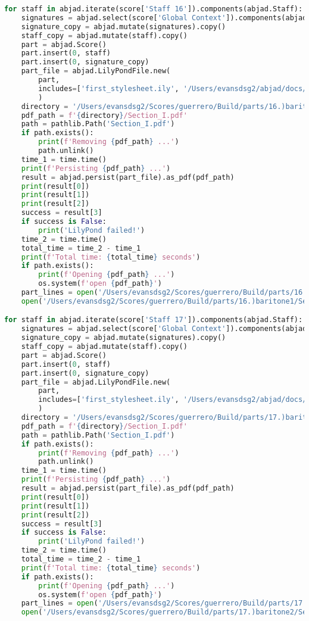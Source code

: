 \begin{lstlisting}[language=Python, caption=Invocation Source Code]
for staff in abjad.iterate(score['Staff 16']).components(abjad.Staff):
    signatures = abjad.select(score['Global Context']).components(abjad.Staff)
    signature_copy = abjad.mutate(signatures).copy()
    staff_copy = abjad.mutate(staff).copy()
    part = abjad.Score()
    part.insert(0, staff)
    part.insert(0, signature_copy)
    part_file = abjad.LilyPondFile.new(
        part,
        includes=['first_stylesheet.ily', '/Users/evansdsg2/abjad/docs/source/_stylesheets/abjad.ily'],
        )
    directory = '/Users/evansdsg2/Scores/guerrero/Build/parts/16.)baritone1'
    pdf_path = f'{directory}/Section_I.pdf'
    path = pathlib.Path('Section_I.pdf')
    if path.exists():
        print(f'Removing {pdf_path} ...')
        path.unlink()
    time_1 = time.time()
    print(f'Persisting {pdf_path} ...')
    result = abjad.persist(part_file).as_pdf(pdf_path)
    print(result[0])
    print(result[1])
    print(result[2])
    success = result[3]
    if success is False:
        print('LilyPond failed!')
    time_2 = time.time()
    total_time = time_2 - time_1
    print(f'Total time: {total_time} seconds')
    if path.exists():
        print(f'Opening {pdf_path} ...')
        os.system(f'open {pdf_path}')
    part_lines = open('/Users/evansdsg2/Scores/guerrero/Build/parts/16.)baritone1/Section_I.ly').readlines()
    open('/Users/evansdsg2/Scores/guerrero/Build/parts/16.)baritone1/Section_I.ly', 'w').writelines(part_lines[15:-1])

for staff in abjad.iterate(score['Staff 17']).components(abjad.Staff):
    signatures = abjad.select(score['Global Context']).components(abjad.Staff)
    signature_copy = abjad.mutate(signatures).copy()
    staff_copy = abjad.mutate(staff).copy()
    part = abjad.Score()
    part.insert(0, staff)
    part.insert(0, signature_copy)
    part_file = abjad.LilyPondFile.new(
        part,
        includes=['first_stylesheet.ily', '/Users/evansdsg2/abjad/docs/source/_stylesheets/abjad.ily'],
        )
    directory = '/Users/evansdsg2/Scores/guerrero/Build/parts/17.)baritone2'
    pdf_path = f'{directory}/Section_I.pdf'
    path = pathlib.Path('Section_I.pdf')
    if path.exists():
        print(f'Removing {pdf_path} ...')
        path.unlink()
    time_1 = time.time()
    print(f'Persisting {pdf_path} ...')
    result = abjad.persist(part_file).as_pdf(pdf_path)
    print(result[0])
    print(result[1])
    print(result[2])
    success = result[3]
    if success is False:
        print('LilyPond failed!')
    time_2 = time.time()
    total_time = time_2 - time_1
    print(f'Total time: {total_time} seconds')
    if path.exists():
        print(f'Opening {pdf_path} ...')
        os.system(f'open {pdf_path}')
    part_lines = open('/Users/evansdsg2/Scores/guerrero/Build/parts/17.)baritone2/Section_I.ly').readlines()
    open('/Users/evansdsg2/Scores/guerrero/Build/parts/17.)baritone2/Section_I.ly', 'w').writelines(part_lines[15:-1])


\end{lstlisting}
